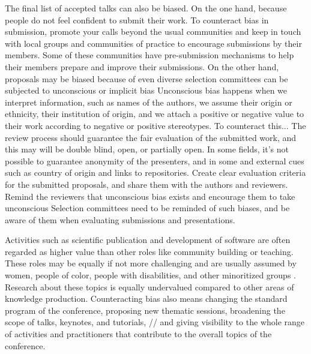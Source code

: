 \documentclass[10pt,letterpaper]{article}
\begin{document}
The final list of accepted talks can also be biased. 
On the one hand, because people do not feel confident to submit their work. 
To counteract bias in submission, promote your calls beyond the usual communities and keep in touch with local groups and communities of practice to encourage submissions by their members.
Some of these communities have pre-submission mechanisms to help their members prepare and improve their submissions.%
On the other hand, proposals may be biased because of even diverse selection committees can be subjected to unconscious or implicit bias %
Unconscious bias happens when we interpret information, such as names of the authors, we assume their origin or ethnicity, their institution of origin, and we attach a positive or negative value to their work according to negative or positive stereotypes. 
To counteract this...
The review process should guarantee the fair evaluation of the submitted work, and this may  will be double blind, open, or partially open. 
In some fields, it's not possible to guarantee anonymity of the presenters, and in some and external cues such as country of origin and links to repositories. 
Create clear evaluation criteria for the submitted proposals, and share them with the authors and reviewers.
Remind the reviewers that unconscious bias exists and encourage them to take unconscious 
Selection committees need to be reminded of such biases, and be aware of them when evaluating submissions and presentations.
\cite{swartzScienceValueDiversity2019, wongBuildDiversityScience2020}

Activities such as scientific publication and development of software are often regarded as higher value than other roles like community building or teaching. 
These roles may be equally if not more challenging and are usually assumed by women, people of color, people with disabilities, and other minoritized groups \cite{cheng2020x+, burfordHomelinessMeantHaving2020}. Research about these topics is equally undervalued compared to other areas of knowledge production. 
Counteracting bias also means changing the standard program of the conference, proposing new thematic sessions, broadening the scope of talks, keynotes, and tutorials, // and giving visibility to the whole range of activities and practitioners that contribute to the overall topics of the conference. 
\end{document}

